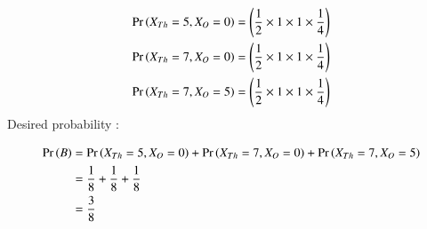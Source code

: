 \documentclass[journal,12pt,onecolumn]{IEEEtran}
\begin{document}
\begin{enumerate}
\begin{align}
\Pr\left(X_{Th}=5,X_O=0\right) &= \left(\frac{1}{2}\times1\times1\times\frac{1}{4} \right) \\
\Pr\left(X_{Th}=7,X_O=0\right) &= \left(\frac{1}{2}\times1\times1\times\frac{1}{4}\right) \\
\Pr\left(X_{Th}=7,X_O=5\right) &= \left(\frac{1}{2}\times1\times1\times\frac{1}{4}\right) 
\end{align}
Desired probability :

\begin{align}
\Pr\left(B\right) &= \Pr\left(X_{Th}=5,X_O=0\right) + \Pr\left(X_{Th}=7,X_O=0\right) + \Pr\left(X_{Th}=7,X_O=5\right) \\
&= \frac{1}{8} + \frac{1}{8} + \frac{1}{8} \\
&= \frac{3}{8}
\end{align}
\end{enumerate}
\end{document}
